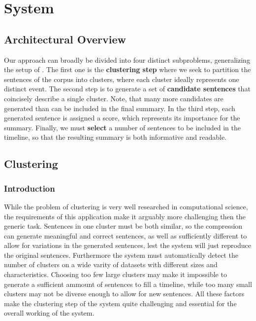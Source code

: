 \documentclass[a4paper,BCOR=10mm]{report}
\begin{document}
\chapter{System}

\section{Architectural Overview}

Our approach can broadly be divided into four distinct subproblems, generalizing the setup of \citet{banerjee}.
The first one is the \textbf{clustering step} where we seek to partition the sentences of the corpus into clusters, where each cluster ideally represents one distinct event.
The second step is to generate a set of \textbf{candidate sentences} that coincisely describe a single cluster. Note, that many more candidates are generated than can be included in the final summary.
In the third step, each generated sentence is assigned a score, which represents its importance for the summary.
Finally, we must \textbf{select} a number of sentences to be included in the timeline, so that the resulting summary is both informative and readable.

\section{Clustering}

\subsection{Introduction}

While the problem of clustering is very well researched in computational science, the requirements of this application make it arguably more challenging then the generic task. Sentences in one cluster must be both similar, so the compression can generate meaningful and correct sentences, as well as sufficiently different to allow for variations in the generated sentences, lest the system will just reproduce the original sentences.
Furthermore the system must automatically detect the number of clusters on a wide varity of datasets with different sizes and characteristics.
Choosing too few large clusters may make it impossible to generate a sufficient ammount of sentences to fill a timeline, while too many small clusters may not be diverse enough to allow for new sentences.
All these factors make the clustering step of the system quite challenging and essential for the overall working of the system.
\end{document}
